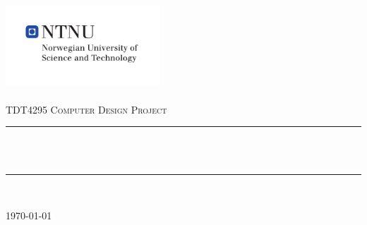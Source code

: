 \begin{titlepage}
\begin{center}
\includegraphics[height=3cm]{images/ntnu_logo.pdf}\\[1cm]   

 
~\\[1.5cm]

\textsc{\Large TDT4295 Computer Design Project}\\[0.5cm]

\hrule ~\\[0.2cm]
{\huge \bfseries \mytitle}\\[0.4cm]		%
\hrule ~\\[1.5cm]

\begin{minipage}{0.4\textwidth}
    \centering
	\large
		\myauthor
\end{minipage}

\vfill

{\large \today}

\end{center}
\end{titlepage}
